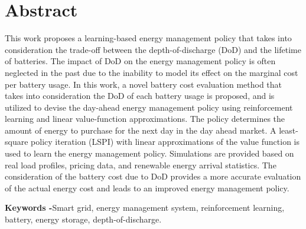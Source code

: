 \chapter*{Abstract}

This work proposes a learning-based energy management policy that takes into consideration the trade-off between the depth-of-discharge (DoD) and the lifetime of batteries. The impact of DoD on the energy management policy is often neglected in the past due to the inability to model its effect on the marginal cost per battery usage. In this work, a novel battery cost evaluation method that takes into consideration the DoD of each battery usage is proposed, and is utilized to devise the day-ahead energy management policy using reinforcement learning and linear value-function approximations. The policy determines the amount of energy to purchase for the next day in the day ahead market. A least-square policy iteration (LSPI) with linear approximations of the value function is used to learn the energy management policy. Simulations are provided based on real load profiles, pricing data, and renewable energy arrival statistics. The consideration of the battery cost due to DoD provides a more accurate evaluation of the actual energy cost and leads to an improved energy management policy.{\let\thefootnote\relax\footnotetext{\ThankOne}}

\noindent \textbf{Keywords -}{Smart grid, energy management system, reinforcement learning, battery, energy storage, depth-of-discharge.}
